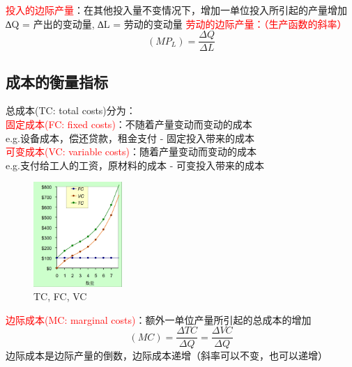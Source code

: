 \documentclass[12pt,a4paper]{article}
\begin{document}
\textcolor{red}{投入的边际产量}：在其他投入量不变情况下，增加一单位投入所引起的产量增加\\

∆Q = 产出的变动量, ∆L = 劳动的变动量
\textcolor{red}{劳动的边际产量：（生产函数的斜率）}
\[
(MP_L) = \frac{\Delta Q}{\Delta L}
\]
\subsection{成本的衡量指标}

\noindent 总成本(TC: total costs)分为：\\
\textcolor{red}{固定成本(FC: fixed costs)}：不随着产量变动而变动的成本\\
e.g.设备成本，偿还贷款，租金支付 - 固定投入带来的成本\\
\textcolor{red}{可变成本(VC: variable costs)}：随着产量变动而变动的成本\\
e.g.支付给工人的工资，原材料的成本 - 可变投入带来的成本\\

\begin{figure}[H] 
  \centering %
  \includegraphics[width=0.3\textwidth]{成本函数.png} 
  \caption{TC, FC, VC} %
\end{figure}

\textcolor{red}{边际成本(MC: marginal costs)}：额外一单位产量所引起的总成本的增加\\
\[
(MC) = \frac{\Delta TC}{\Delta Q} = \frac{\Delta VC}{\Delta Q} 
\]
边际成本是边际产量的倒数，边际成本递增（斜率可以不变，也可以递增）\\
\end{document}
